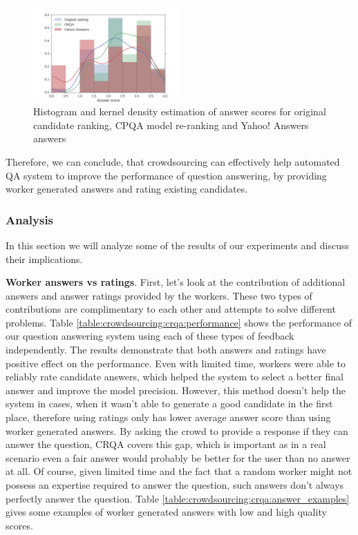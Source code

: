\begin{figure}[h]
	\centering
	\includegraphics[width=0.5\textwidth]{img/crqa_score_hist}
	\caption{Histogram and kernel density estimation of answer scores for original candidate ranking, CPQA model re-ranking and Yahoo! Answers answers}
	\label{figure:crowdsourcing:crqa:score_histogram}
\end{figure}

Therefore, we can conclude, that crowdsourcing can effectively help automated QA system to improve the performance of question answering, by providing worker generated answers and rating existing candidates.

\subsubsection{Analysis}
\label{section:crowdsourcing:approach:crqa:analysis}

In this section we will analyze some of the results of our experiments and discuss their implications.

\textbf{Worker answers vs ratings}.
First, let's look at the contribution of additional answers and answer ratings provided by the workers.
These two types of contributions are complimentary to each other and attempts to solve different problems.
Table \ref{table:crowdsourcing:crqa:performance} shows the performance of our question answering system using each of these types of feedback independently.
The results demonstrate that both answers and ratings have positive effect on the performance.
Even with limited time, workers were able to reliably rate candidate answers, which helped the system to select a better final answer and improve the model precision.
However, this method doesn't help the system in cases, when it wasn't able to generate a good candidate in the first place, therefore using ratings only has lower average answer score than using worker generated answers.
By asking the crowd to provide a response if they can answer the question, CRQA covers this gap, which is important as in a real scenario even a fair answer would probably be better for the user than no answer at all.
Of course, given limited time and the fact that a random worker might not possess an expertise required to answer the question, such answers don't always perfectly answer the question.
Table \ref{table:crowdsourcing:crqa:answer_examples} gives some examples of worker generated answers with low and high quality scores.

